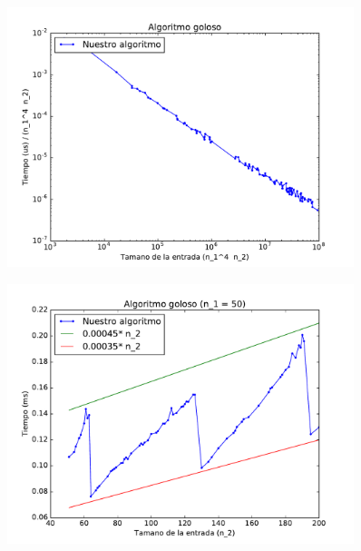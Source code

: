 

\begin{figure}[H]
 \centering
	\includegraphics[width=0.9\textwidth]{graficos/problema_4/tiempos_1.pdf}
	\caption{}
	\label{fig:problema4-1}
\end{figure}


\begin{figure}[H]
 \centering
	\includegraphics[width=0.9\textwidth]{graficos/problema_4/tiempos_2.pdf}
	\caption{}
	\label{fig:problema4-2}
\end{figure}

